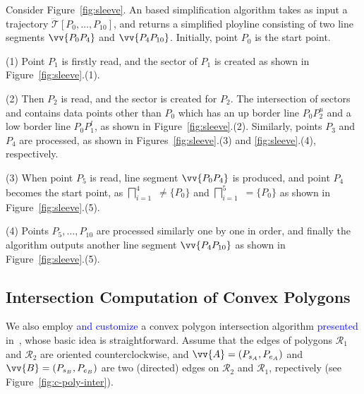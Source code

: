 \begin{example}
\label{exm-alg-sleeve}
Consider Figure~\ref{fig:sleeve}. An \cia based simplification algorithm takes as input a trajectory $\dddot{\mathcal{T}}[P_0, \ldots, P_{10}]$, and returns a simplified ployline consisting of two line segments $\vv{P_0P_4}$ and  $\vv{P_4P_{10}}$. Initially, point $P_0$ is the start point.

\sstab(1) Point $P_1$ is firstly read, and the sector  of $P_1$ is created as shown in Figure~\ref{fig:sleeve}.(1).

\sstab(2) Then $P_2$ is read, and the sector   is created for $P_2$. The intersection of sectors  and   contains data points other than $P_0$  which has an up border line $P_0P_2^u$ and a low border line $P_0P_1^l$, as shown in Figure~\ref{fig:sleeve}.(2).
Similarly, points $P_3$ and $P_4$ are processed, as shown in Figures~\ref{fig:sleeve}.(3) and \ref{fig:sleeve}.(4), respectively.

\sstab(3) When point $P_5$ is read,  line segment $\vv{P_0P_4}$ is produced, and point $P_4$ becomes the start point, as $\bigsqcap_{i=1}^{4}$ $\ne\{P_0\}$ and $\bigsqcap_{i=1}^{5}$ $=\{P_0\}$ as shown in Figure~\ref{fig:sleeve}.(5).


\sstab(4) Points $P_5, \ldots, P_{10}$ are processed similarly one by one in order, and finally the algorithm outputs another line segment $\vv{P_4P_{10}}$ as shown in Figure~\ref{fig:sleeve}.(5).
\end{example}




\subsection{Intersection Computation of Convex Polygons}
\label{subsec-cpi}

We also employ \textcolor{blue}{and customize} a convex polygon intersection algorithm \textcolor{blue}{presented} in~\cite{ORourke:Intersection}, whose basic idea is straightforward.
Assume \kwlog that the edges of polygons $\mathcal{R}_1$ and $\mathcal{R}_2$ are oriented counterclockwise, and $\vv{A} = (P_{s_A}, P_{e_A})$ and $\vv{B} = (P_{s_B}, P_{e_B})$ are two (directed) edges on $\mathcal{R}_2$ and $\mathcal{R}_1$, repectively (see Figure~\ref{fig:c-poly-inter}).

